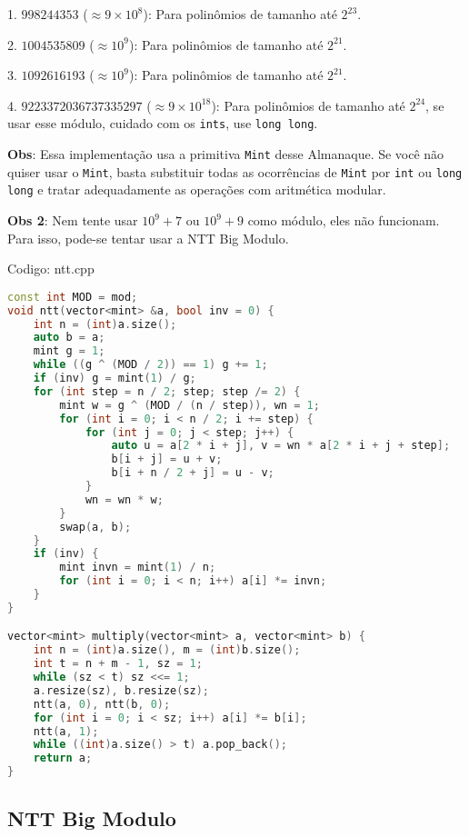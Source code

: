 \documentclass[10pt, a4paper, oneside]{book}
\begin{document}
1. $998244353$ ($\approx 9 \times 10^8$): Para polinômios de tamanho até $2^{23}$.

2. $1004535809$ ($\approx 10^9$): Para polinômios de tamanho até $2^{21}$.

3. $1092616193$ ($\approx 10^9$): Para polinômios de tamanho até $2^{21}$.

4. $9223372036737335297$ ($\approx 9 \times 10^{18}$): Para polinômios de tamanho até $2^{24}$, se usar esse módulo, cuidado com os \texttt{ints}, use \texttt{long long}.



\textbf{Obs}: Essa implementação usa a primitiva \texttt{Mint} desse Almanaque. Se você não quiser usar o \texttt{Mint}, basta substituir todas as ocorrências de \texttt{Mint} por \texttt{int} ou \texttt{long long} e tratar adequadamente as operações com aritmética modular.



\textbf{Obs 2}: Nem tente usar $10^9 + 7$ ou $10^9 + 9$ como módulo, eles não funcionam. Para isso, pode-se tentar usar a NTT Big Modulo.
\hfill

Codigo: ntt.cpp

\begin{lstlisting}[language=C++]
const int MOD = mod;
void ntt(vector<mint> &a, bool inv = 0) {
    int n = (int)a.size();
    auto b = a;
    mint g = 1;
    while ((g ^ (MOD / 2)) == 1) g += 1;
    if (inv) g = mint(1) / g;
    for (int step = n / 2; step; step /= 2) {
        mint w = g ^ (MOD / (n / step)), wn = 1;
        for (int i = 0; i < n / 2; i += step) {
            for (int j = 0; j < step; j++) {
                auto u = a[2 * i + j], v = wn * a[2 * i + j + step];
                b[i + j] = u + v;
                b[i + n / 2 + j] = u - v;
            }
            wn = wn * w;
        }
        swap(a, b);
    }
    if (inv) {
        mint invn = mint(1) / n;
        for (int i = 0; i < n; i++) a[i] *= invn;
    }
}

vector<mint> multiply(vector<mint> a, vector<mint> b) {
    int n = (int)a.size(), m = (int)b.size();
    int t = n + m - 1, sz = 1;
    while (sz < t) sz <<= 1;
    a.resize(sz), b.resize(sz);
    ntt(a, 0), ntt(b, 0);
    for (int i = 0; i < sz; i++) a[i] *= b[i];
    ntt(a, 1);
    while ((int)a.size() > t) a.pop_back();
    return a;
}
\end{lstlisting}
\hfill

\subsection{NTT Big Modulo}
\end{document}
